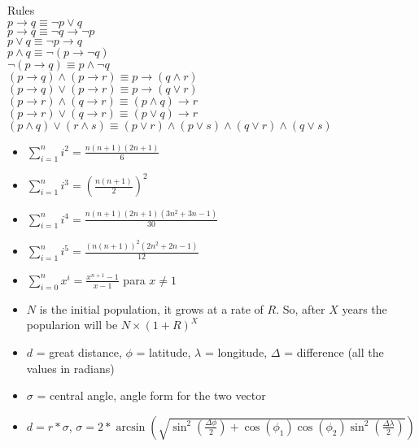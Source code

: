  Rules \\
$ p \rightarrow q \equiv \lnot p \lor q$ \\
$ p \rightarrow q \equiv \lnot q \rightarrow \lnot p$ \\
$ p \lor q \equiv \lnot p \rightarrow q$ 	\\
$ p \land q \equiv \lnot (p \rightarrow \lnot q)$	 \\
$ \lnot (p \rightarrow q) \equiv p \land \lnot q$ \\
$ (p \rightarrow q) \land (p \rightarrow r) \equiv p \rightarrow (q \land r)$ \\
$ (p \rightarrow q) \lor (p \rightarrow r) \equiv p \rightarrow (q \lor r)$ \\
$ (p \rightarrow r) \land (q \rightarrow r) \equiv (p \land q) \rightarrow r$ \\
$ (p \rightarrow r) \lor (q \rightarrow r) \equiv (p \lor q) \rightarrow r$ \\
$(p \land q) \lor (r \land s) \equiv (p \lor r) \land (p \lor s) \land (q \lor r) \land (q \lor s)$ \\


\begin{itemize}
\item	$\sum_{i=1}^{n} i^2 = \frac{n(n+1)(2n+1)}{6}$
\item	$\sum_{i=1}^{n} i^3 = (\frac{n(n+1)}{2})^2$
\item	$\sum_{i=1}^{n} i^4 = \frac{n(n+1)(2n+1)(3n^2+3n-1)}{30}$
\item	$\sum_{i=1}^{n} i^5 = \frac{(n(n+1))^2(2n^2+2n-1)}{12}$
\item	$\sum_{i=0}^{n} x^i = \frac{x^{n+1}-1}{x-1}$ para $x \neq 1$	
\end{itemize}

\begin{itemize}
\item $N$ is the initial population, it grows at a rate of $R$. So, after $X$ years the popularion will be $N \times (1 + R) ^ X$
\end{itemize}

\begin{itemize}
\item $d$ = great distance, $\phi$ = latitude, $\lambda$ = longitude, $\Delta$ = difference (all the values in radians)
\item $\sigma$ = central angle, angle form for the two vector
\item $d = r * \sigma$, $\sigma = 2 * \arcsin(\sqrt{\sin^2(\frac{\Delta\phi}{2}) + \cos(\phi_1)\cos(\phi_2)\sin^2(\frac{\Delta\lambda}{2})})$
\end{itemize}

